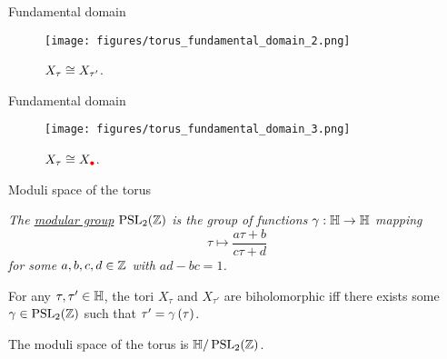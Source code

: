 \documentclass{beamer}
\begin{document}
    \begin{frame}{Fundamental domain}
        \begin{figure}
            \texttt{[image: figures/torus\_fundamental\_domain\_2.png]}
            \caption{$X_\tau\cong X_{\tau'}$.}
        \end{figure}
    \end{frame}
    \begin{frame}{Fundamental domain}
        \begin{figure}
            \texttt{[image: figures/torus\_fundamental\_domain\_3.png]}
            \caption{$X_\tau\cong X_{\color{red}\bullet}$.}
        \end{figure}
    \end{frame}
    \begin{frame}{Moduli space of the torus}
        \begin{definition}
            \textit{The \ul{modular group} $\operatorname{PSL}_{2}\!\left(\mathbb{Z}\right)$ is the group of functions $\gamma:\mathbb{H}\to\mathbb{H}$ mapping}
            \begin{equation*}
                \tau\mapsto\frac{a\tau+b}{c\tau+d}
            \end{equation*}
            \textit{for some $a,b,c,d\in\mathbb{Z}$ with $ad-bc=1$.}
        \end{definition}

        \pause

        \begin{theorem}
            For any $\tau,\tau'\in\mathbb{H}$, the tori $X_\tau$ and $X_{\tau'}$ are biholomorphic iff there exists some $\gamma\in\operatorname{PSL}_{2}\!\left(\mathbb{Z}\right)$ such that $\tau'=\gamma\left(\tau\right)$.
        \end{theorem}

        \pause

        \begin{corollary}
            The moduli space of the torus is $\mathbb{H}/\operatorname{PSL}_{2}\!\left(\mathbb{Z}\right)$.
        \end{corollary}
    \end{frame}
\end{document}
